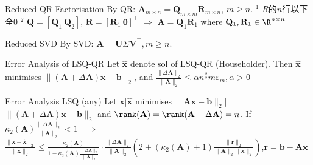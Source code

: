 \documentclass{note}
\begin{document}
\begin{MyTh}{Reduced QR Factorisation}
  By QR: $\mathbf{A}_{m\times n}=\mathbf{Q}_{m\times m}\mathbf{R}_{m\times n}$, $m\geq n$. {\scriptsize \quad $^1$ $R$的$n$行以下全0 \quad $^2$ $\mathbf{Q}=[\mathbf{Q}_1 \ \mathbf{Q}_2]$, $\mathbf{R}=[\mathbf{R}_1 \ \mathbf{0}]^{\top}$ $\Rightarrow$ $\mathbf{A}=\mathbf{Q}_1\mathbf{R}_1$ where $\mathbf{Q}_1,\mathbf{R}_1\in \R^{n\times n}$}
\end{MyTh}

\begin{MyTh}{Reduced SVD}
  By SVD: $\mathbf{A}=\mathbf{U}\Sigma\mathbf{V}^\top,m\geq n$. 
\end{MyTh}

\vspace{-1pt}
\begin{MyTh}{Error Analysis of LSQ-QR}
  Let $\widehat{\mathbf{x}}$ denote sol of LSQ-QR (Householder). \quad Then $\widehat{\mathbf{x}}$ minimises $\|(\mathbf{A}+\Delta\mathbf{A})\mathbf{x}-\mathbf{b}\|_2$, and $\frac{\|\Delta\mathbf{A}\|_2}{\|\mathbf{A}\|_2}\leq \alpha n^{\frac{3}{2}}m\varepsilon_m,\alpha>0$
\end{MyTh}

\vspace{-1pt}
\begin{MyTh}{Error Analysis LSQ (any)}
  \tiny Let $\mathbf{x}$|$\widehat{\mathbf{x}}$ minimises $\|\mathbf{Ax}-\mathbf{b}\|_2$|$\|(\mathbf{A}+\Delta\mathbf{A})\mathbf{x}-\mathbf{b}\|_2$ and $\rank(\mathbf{A})=\rank(\mathbf{A}+\Delta\mathbf{A})=n$. \quad If $\kappa_2(\mathbf{A})\frac{\|\Delta\mathbf{A}\|_2}{\|\mathbf{A}\|_2}<1$ \ $\Rightarrow$ \ $\frac{\|\mathbf{x}-\widehat{\mathbf{x}}\|_2}{\|\mathbf{x}\|_2}\leq\frac{\kappa_2(\mathbf{A})}{1-\kappa_2(\mathbf{A})\frac{\|\Delta\mathbf{A}\|_2}{\|\mathbf{A}\|_2}}\cdot\frac{\|\Delta\mathbf{A}\|_2}{\|\mathbf{A}\|_2}\left(2+(\kappa_2(\mathbf{A})+1)\frac{\|\mathbf{r}\|_2}{\|\mathbf{A}\|_2\|\mathbf{x}\|_2}\right)$,$\mathbf{r}=\mathbf{b}-\mathbf{Ax}$
\end{MyTh}
\vspace{-6pt}
\end{document}
